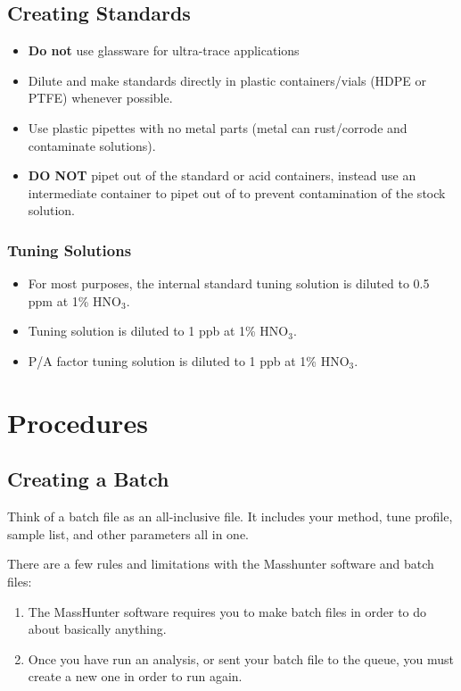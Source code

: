 \documentclass[12pt]{../SOP4_alpha}\usepackage[]{graphicx}\usepackage[]{color}
\begin{document}
\subsection{Creating Standards}

\begin{itemize}
  \item \textbf{Do not} use glassware for ultra-trace applications
  \item Dilute and make standards directly in plastic containers/vials (HDPE or PTFE) whenever possible.
  \item Use plastic pipettes with no metal parts (metal can rust/corrode and contaminate solutions).
  \item \textbf{DO NOT} pipet out of the standard or acid containers, instead use an intermediate container to pipet out of to prevent contamination of the stock solution.
\end{itemize}

\subsubsection{Tuning Solutions}

\begin{itemize}
  \item For most purposes, the internal standard tuning solution is diluted to 0.5 ppm at 1\% HNO$_3$.
  \item Tuning solution is diluted to 1 ppb at 1\% HNO$_3$.
  \item P/A factor tuning solution is diluted to 1 ppb at 1\% HNO$_3$.
\end{itemize}

\section{Procedures}

\subsection{Creating a Batch}

\NP Think of a batch file as an all-inclusive file. It includes your method, tune profile, sample list, and other parameters all in one.

\NP There are a few rules and limitations with the Masshunter software and batch files:

\begin{enumerate}
\item The MassHunter software requires you to make batch files in order to do about basically anything.
\item Once you have run an analysis, or sent your batch file to the queue, you must create a new one in order to run again.
\end{enumerate}
\end{document}
